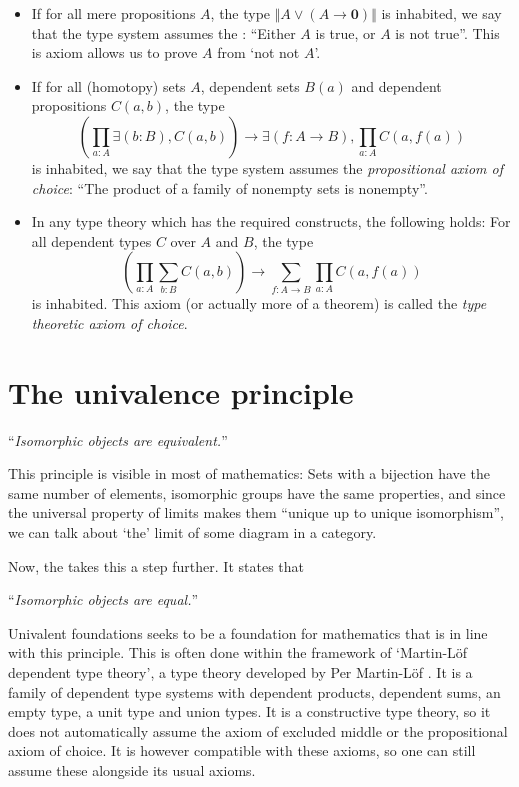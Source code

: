 \begin{itemize}
  \item If for all mere propositions $ A $, the type $ \Vert A \lor (A \to \mathbf 0) \Vert $ is inhabited, we say that the type system assumes the : ``Either $ A $ is true, or $ A $ is not true''. This is axiom allows us to prove $ A $ from `not not $ A $'.
  \item If for all (homotopy) sets $ A $, dependent sets $ B(a) $ and dependent propositions $ C(a, b) $, the type
    \[ \left(\prod_{a: A} \exists (b: B), C(a, b) \right) \to \exists (f: A \to B), \prod_{a: A} C(a, f(a)) \]
    is inhabited, we say that the type system assumes the \textit{propositional axiom of choice}: ``The product of a family of nonempty sets is nonempty''.
  \item In any type theory which has the required constructs, the following holds: For all dependent types $ C $ over $ A $ and $ B $, the type
    \[ \left(\prod_{a: A} \sum_{b: B} C(a, b) \right) \to \sum_{f: A \to B} \prod_{a: A} C(a, f(a)) \]
    is inhabited. This axiom (or actually more of a theorem) is called the \textit{type theoretic axiom of choice}.
\end{itemize}

\section{The univalence principle}\label{sec:univalence-principle}
\enquote{\textit{Isomorphic objects are equivalent.}}

This principle is visible in most of mathematics: Sets with a bijection have the same number of elements, isomorphic groups have the same properties, and since the universal property of limits makes them ``unique up to unique isomorphism'', we can talk about `the' limit of some diagram in a category.

Now, the  takes this a step further. It states that

\enquote{\textit{Isomorphic objects are equal.}}

Univalent foundations seeks to be a foundation for mathematics that is in line with this principle. This is often done within the framework of `Martin-Löf dependent type theory', a type theory developed by Per Martin-Löf \autocite{martin-lof-type-theory}. It is a family of dependent type systems with dependent products, dependent sums, an empty type, a unit type and union types. It is a constructive type theory, so it does not automatically assume the axiom of excluded middle or the propositional axiom of choice. It is however compatible with these axioms, so one can still assume these alongside its usual axioms.

